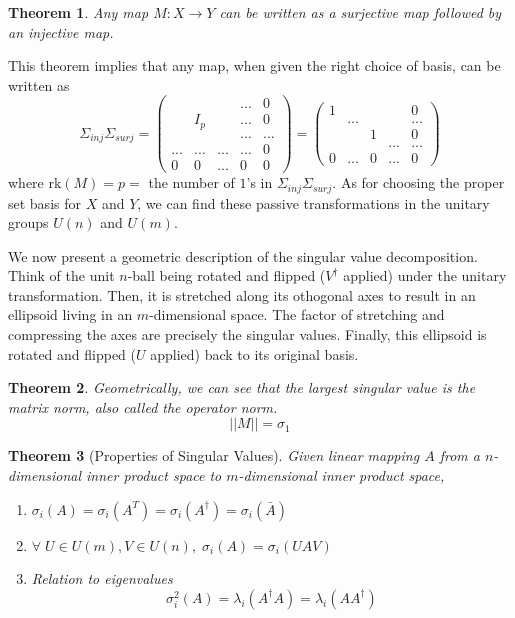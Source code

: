 \documentclass{article}
\newtheorem{theorem}{Theorem}[section]
\theoremstyle{remark}
\theoremstyle{definition}
\begin{document}
    \begin{theorem}
    Any map $M: X \longrightarrow Y$ can be written as a surjective map followed by an injective map. 
    \end{theorem}

    This theorem implies that any map, when given the right choice of basis, can be written as 
    \[ \Sigma_{inj} \Sigma_{surj} = \begin{pmatrix}
    &&&...&0\\
    &I_p&&...&0\\
    &&&...&...\\
    ...&...&...&...&0\\
    0&0&...&0&0
    \end{pmatrix} = \begin{pmatrix}
    1&&&&0\\
    &...&&&...\\
    &&1&&0\\
    &&&...&...\\
    0&...&0&...&0
    \end{pmatrix}\]
    where rk$(M) = p = $ the number of $1$'s in $\Sigma_{inj} \Sigma_{surj}$. As for choosing the proper set basis for $X$ and $Y$, we can find these passive transformations in the unitary groups $U(n)$ and $U(m)$. 

    We now present a geometric description of the singular value decomposition. Think of the unit $n$-ball being rotated and flipped ($V^\dagger$ applied) under the unitary transformation. Then, it is stretched along its othogonal axes to result in an ellipsoid living in an $m$-dimensional space. The factor of stretching and compressing the axes are precisely the singular values. Finally, this ellipsoid is rotated and flipped ($U$ applied) back to its original basis. 

    \begin{theorem}
    Geometrically, we can see that the largest singular value is the matrix norm, also called the operator norm. 
    \[||M|| = \sigma_1\]
    \end{theorem}

    \begin{theorem}[Properties of Singular Values] Given linear mapping $A$ from a $n$-dimensional inner product space to $m$-dimensional inner product space, 
    \begin{enumerate}
        \item $\sigma_i(A) = \sigma_i (A^T) = \sigma_i (A^\dagger) = \sigma_i (\bar{A})$
        \item $\forall \; U \in U(m), V \in U(n), \; \sigma_i (A) = \sigma_i (U A V)$
        \item Relation to eigenvalues
    \[\sigma_i^2(A) = \lambda_i (A^\dagger A) = \lambda_i (A A^\dagger)\]
    \end{enumerate}
    \end{theorem}
\end{document}

